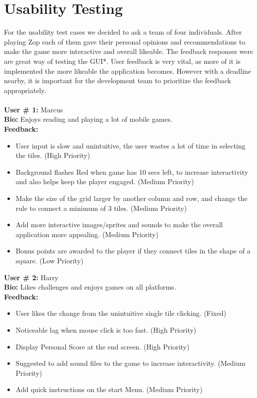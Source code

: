 \documentclass[12pt]{article}
\begin{document}
\section{Usability Testing}
For the usability test cases we decided to ask a team of four individuals. After playing Zop each of them gave their personal opinions and recommendations to make the game more interactive and overall likeable. The feedback responses were are great way of testing the GUI*. User feedback is very vital, as more of it is implemented the more likeable the application becomes. However with a deadline nearby, it is important for the development team to prioritize the feedback appropriately.\\\\
\textbf{User \# 1:}
Marcus\\
\textbf{Bio:}
Enjoys reading and playing a lot of mobile games.\\
\textbf{Feedback:}
\begin{itemize}
 \item User input is slow and unintuitive, the user wastes a lot of time in selecting the tiles. (High Priority)
 \item Background flashes Red when game has 10 secs left, to increase interactivity and also helps keep the player engaged. (Medium Priority)
\item Make the size of the grid larger by another column and row, and change the rule to connect a minimum of 3 tiles. (Medium Priority)
\item Add more interactive images/sprites and sounds to make the overall application more appealing. (Medium Priority)
 \item Bonus points are awarded to the player if they connect tiles in the shape of a square. (Low Priority)
\end{itemize}
\textbf{User \# 2:}
Harry\\
\textbf{Bio:}
Likes challenges and enjoys games on all platforms.\\
\textbf{Feedback:}
\begin{itemize}
 \item User likes the change from the unintuitive single tile clicking. (Fixed)
\item Noticeable lag when mouse click is too fast. (High Priority)
\item Display Personal Score at the end screen. (High Priority)
\item Suggested to add sound files to the game to increase interactivity. (Medium Priority)
\item Add quick instructions on the start Menu. (Medium Priority)
\end{itemize}
\end{document}
